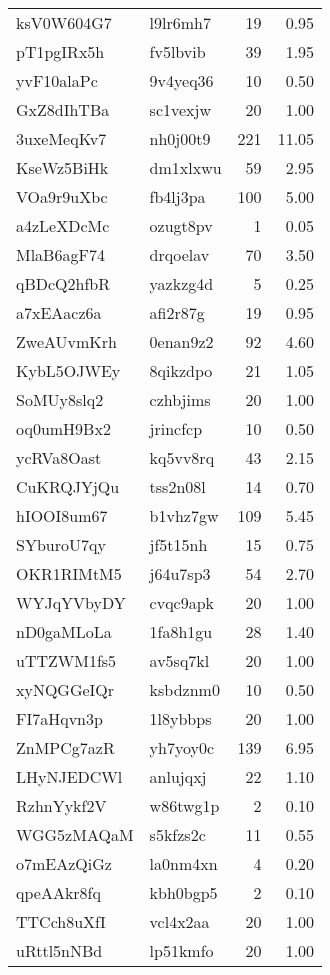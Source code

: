 \documentclass[]{elsarticle} %
\begin{document}
\begin{longtable}{llrr}
ksV0W604G7 & l9lr6mh7 & 19 & 0.95\\
\addlinespace
pT1pgIRx5h & fv5lbvib & 39 & 1.95\\
yvF10alaPc & 9v4yeq36 & 10 & 0.50\\
GxZ8dIhTBa & sc1vexjw & 20 & 1.00\\
3uxeMeqKv7 & nh0j00t9 & 221 & 11.05\\
KseWz5BiHk & dm1xlxwu & 59 & 2.95\\
\addlinespace
VOa9r9uXbc & fb4lj3pa & 100 & 5.00\\
a4zLeXDcMc & ozugt8pv & 1 & 0.05\\
MlaB6agF74 & drqoelav & 70 & 3.50\\
qBDcQ2hfbR & yazkzg4d & 5 & 0.25\\
a7xEAacz6a & afi2r87g & 19 & 0.95\\
\addlinespace
ZweAUvmKrh & 0enan9z2 & 92 & 4.60\\
KybL5OJWEy & 8qikzdpo & 21 & 1.05\\
SoMUy8slq2 & czhbjims & 20 & 1.00\\
oq0umH9Bx2 & jrincfcp & 10 & 0.50\\
ycRVa8Oast & kq5vv8rq & 43 & 2.15\\
\addlinespace
CuKRQJYjQu & tss2n08l & 14 & 0.70\\
hIOOI8um67 & b1vhz7gw & 109 & 5.45\\
SYburoU7qy & jf5t15nh & 15 & 0.75\\
OKR1RIMtM5 & j64u7sp3 & 54 & 2.70\\
WYJqYVbyDY & cvqc9apk & 20 & 1.00\\
\addlinespace
nD0gaMLoLa & 1fa8h1gu & 28 & 1.40\\
uTTZWM1fs5 & av5sq7kl & 20 & 1.00\\
xyNQGGeIQr & ksbdznm0 & 10 & 0.50\\
FI7aHqvn3p & 1l8ybbps & 20 & 1.00\\
ZnMPCg7azR & yh7yoy0c & 139 & 6.95\\
\addlinespace
LHyNJEDCWl & anlujqxj & 22 & 1.10\\
RzhnYykf2V & w86twg1p & 2 & 0.10\\
WGG5zMAQaM & s5kfzs2c & 11 & 0.55\\
o7mEAzQiGz & la0nm4xn & 4 & 0.20\\
qpeAAkr8fq & kbh0bgp5 & 2 & 0.10\\
\addlinespace
TTCch8uXfI & vcl4x2aa & 20 & 1.00\\
uRttl5nNBd & lp51kmfo & 20 & 1.00\\

\end{longtable}
\end{document}
